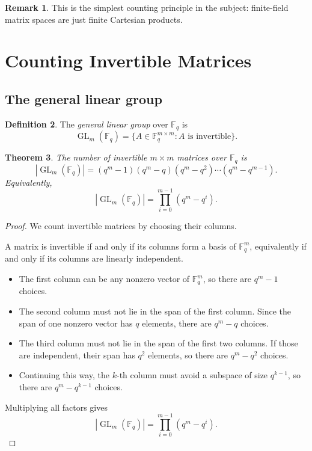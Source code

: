 \documentclass[11pt]{article}
\newcommand{\F}{\mathbb{F}}
\newcommand{\GL}{\operatorname{GL}}
\theoremstyle{definition}
\newtheorem{definition}{Definition}[section]
\newtheorem{remark}[definition]{Remark}
\theoremstyle{plain}
\newtheorem{theorem}[definition]{Theorem}
\begin{document}
	\begin{remark}
		This is the simplest counting principle in the subject: finite-field matrix spaces are just finite Cartesian products.
	\end{remark}
	
	\section{Counting Invertible Matrices}
	
	\subsection{The general linear group}
	
	\begin{definition}
		The \emph{general linear group} over \(\F_q\) is
		\[
		\GL_m(\F_q) = \{A\in \F_q^{m\times m} : A \text{ is invertible}\}.
		\]
	\end{definition}
	
	\begin{theorem}
		The number of invertible \(m\times m\) matrices over \(\F_q\) is
		\[
		|\GL_m(\F_q)| = (q^m-1)(q^m-q)(q^m-q^2)\cdots(q^m-q^{m-1}).
		\]
		Equivalently,
		\[
		|\GL_m(\F_q)| = \prod_{i=0}^{m-1}(q^m-q^i).
		\]
	\end{theorem}
	
	\begin{proof}
		We count invertible matrices by choosing their columns.
		
		A matrix is invertible if and only if its columns form a basis of \(\F_q^m\), equivalently if and only if its columns are linearly independent.
		
		\begin{itemize}[leftmargin=2em]
			\item The first column can be any nonzero vector of \(\F_q^m\), so there are \(q^m-1\) choices.
			\item The second column must not lie in the span of the first column. Since the span of one nonzero vector has \(q\) elements, there are \(q^m-q\) choices.
			\item The third column must not lie in the span of the first two columns. If those are independent, their span has \(q^2\) elements, so there are \(q^m-q^2\) choices.
			\item Continuing this way, the \(k\)-th column must avoid a subspace of size \(q^{k-1}\), so there are \(q^m-q^{k-1}\) choices.
		\end{itemize}
		
		Multiplying all factors gives
		\[
		|\GL_m(\F_q)| = \prod_{i=0}^{m-1}(q^m-q^i).
		\]
	\end{proof}
	
\end{document}
